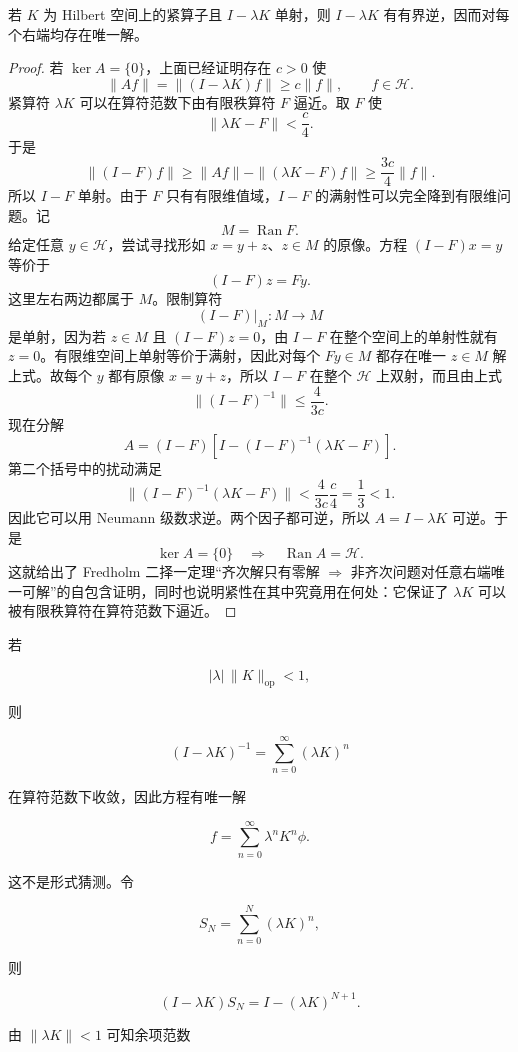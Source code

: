 \begin{proposition}
若 $K$ 为 Hilbert 空间上的紧算子且 $I-\lambda K$ 单射，则 $I-\lambda K$ 有有界逆，因而对每个右端均存在唯一解。
\end{proposition}
\begin{proof}
若 $\ker A=\{0\}$，上面已经证明存在 $c>0$ 使
\[
\|Af\|=\|(I-\lambda K)f\|\ge c\|f\|,
\qquad f\in\mathcal H.
\]
紧算符 $\lambda K$ 可以在算符范数下由有限秩算符 $F$ 逼近。取 $F$ 使
\[
\|\lambda K-F\|<\frac c4.
\]
于是
\[
\|(I-F)f\|
\ge \|Af\|-\|(\lambda K-F)f\|
\ge\frac{3c}{4}\|f\|.
\]
所以 $I-F$ 单射。由于 $F$ 只有有限维值域，$I-F$ 的满射性可以完全降到有限维问题。记
\[
M=\operatorname{Ran}F.
\]
给定任意 $y\in\mathcal H$，尝试寻找形如 $x=y+z$、$z\in M$ 的原像。方程 $ (I-F)x=y$ 等价于
\[
(I-F)z=Fy.
\]
这里左右两边都属于 $M$。限制算符
\[
(I-F)|_M:M\to M
\]
是单射，因为若 $z\in M$ 且 $(I-F)z=0$，由 $I-F$ 在整个空间上的单射性就有 $z=0$。有限维空间上单射等价于满射，因此对每个 $Fy\in M$ 都存在唯一 $z\in M$ 解上式。故每个 $y$ 都有原像 $x=y+z$，所以 $I-F$ 在整个 $\mathcal H$ 上双射，而且由上式
\[
\|(I-F)^{-1}\|\le\frac{4}{3c}.
\]
现在分解
\[
A
=(I-F)\left[I-(I-F)^{-1}(\lambda K-F)\right].
\]
第二个括号中的扰动满足
\[
\|(I-F)^{-1}(\lambda K-F)\|
<\frac{4}{3c}\frac c4
=\frac13<1.
\]
因此它可以用 Neumann 级数求逆。两个因子都可逆，所以 $A=I-\lambda K$ 可逆。于是
\[
\ker A=\{0\}
\quad\Longrightarrow\quad
\operatorname{Ran}A=\mathcal H.
\]
这就给出了 Fredholm 二择一定理“齐次解只有零解 $\Rightarrow$ 非齐次问题对任意右端唯一可解”的自包含证明，同时也说明紧性在其中究竟用在何处：它保证了 $\lambda K$ 可以被有限秩算符在算符范数下逼近。
\end{proof}



若

\[
|\lambda|\,\|K\|_{\mathrm{op}}<1,
\]

则

\[
(I-\lambda K)^{-1}
=\sum_{n=0}^{\infty}(\lambda K)^n
\]

在算符范数下收敛，因此方程有唯一解

\begin{equation*}{f=\sum_{n=0}^{\infty}\lambda^nK^n\phi}.\end{equation*}

这不是形式猜测。令

\[
S_N=\sum_{n=0}^N(\lambda K)^n,
\]

则

\[
(I-\lambda K)S_N=I-(\lambda K)^{N+1}.
\]

由 $\|\lambda K\|<1$ 可知余项范数

